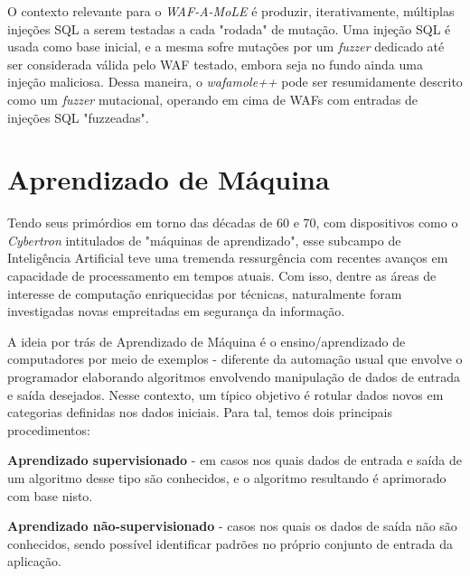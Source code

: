 O contexto relevante para o \textit{WAF-A-MoLE} é produzir, iterativamente, múltiplas injeções SQL a serem testadas a cada "rodada" de mutação. Uma injeção SQL é usada como base inicial, e a mesma sofre mutações por um \textit{fuzzer} dedicado até ser considerada válida pelo WAF testado, embora seja no fundo ainda uma injeção maliciosa. Dessa maneira, o \textit{wafamole++} pode ser resumidamente descrito como um \textit{fuzzer} mutacional, operando em cima de WAFs com entradas de injeções SQL "fuzzeadas".

\section{Aprendizado de Máquina}

Tendo seus primórdios em torno das décadas de 60 e 70, com dispositivos como o \textit{Cybertron} intitulados de "máquinas de aprendizado", esse subcampo de Inteligência Artificial teve uma tremenda ressurgência com recentes avanços em capacidade de processamento em tempos atuais. Com isso, dentre as áreas de interesse de computação enriquecidas por técnicas, naturalmente foram investigadas novas empreitadas em segurança da informação.

A ideia por trás de Aprendizado de Máquina \cite{dantas_transformers_2021} é o ensino/aprendizado de computadores por meio de exemplos - diferente da automação usual que envolve o programador elaborando algoritmos envolvendo manipulação de dados de entrada e saída desejados. Nesse contexto, um típico objetivo é rotular dados novos em categorias definidas nos dados iniciais. Para tal, temos dois principais procedimentos:
\begin{alineas}
\item \textbf{Aprendizado supervisionado} - em casos nos quais dados de entrada e saída de um algoritmo desse tipo são conhecidos, e o algoritmo resultando é aprimorado com base nisto.
\item \textbf{Aprendizado não-supervisionado} - casos nos quais os dados de saída não são conhecidos, sendo possível identificar padrões no próprio conjunto de entrada da aplicação.
\end{alineas}


